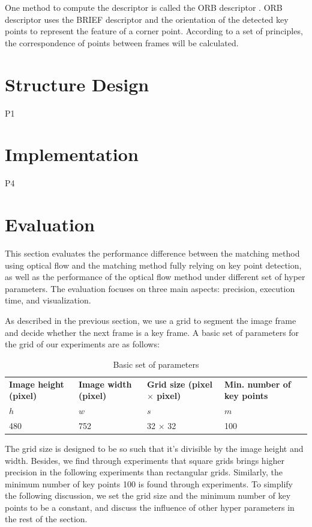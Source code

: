 \documentclass[conference]{IEEEtran}
\begin{document}
One method to compute the descriptor is called the ORB descriptor \cite{orb}. ORB descriptor uses the BRIEF descriptor \cite{brief} and the orientation of the detected key points to represent the feature of a corner point. According to a set of principles, the correspondence of points between frames will be calculated.
  
\section{Structure Design}
P1
\section{Implementation}
P4


\section{Evaluation}
This section evaluates the performance difference between the matching method using optical flow and the matching method fully relying on key point detection, as well as the performance of the optical flow method under different set of hyper parameters. The evaluation focuses on three main aspects: precision, execution time, and visualization.

As described in the previous section, we use a grid to segment the image frame and decide whether the next frame is a key frame. A basic set of parameters for the grid of our experiments are as follows:


\begin{table}[h!]
	\begin{center}
		\caption{Basic set of parameters}
		\label{tab:basicset}
		\begin{tabular}{llll} %
			\textbf{Image height (pixel)} & \textbf{Image width (pixel)} & \textbf{Grid size (pixel $\times$ pixel)}& \textbf{Min. number of key points}\\
			$h$ & $w$ & $s$ & $m$ \\
			\hline
			480 & 752 & 32 $\times$ 32 & 100 \\
	
		\end{tabular}
	\end{center}
\end{table}

The grid size is designed to be so such that it's divisible by the image height and width. Besides, we find through experiments that square grids brings higher precision in the following experiments than rectangular grids. Similarly, the minimum number of key points 100 is found through experiments. To simplify the following discussion, we set the grid size and the minimum number of key points to be a constant, and discuss the influence of other hyper parameters in the rest of the section.
\end{document}
